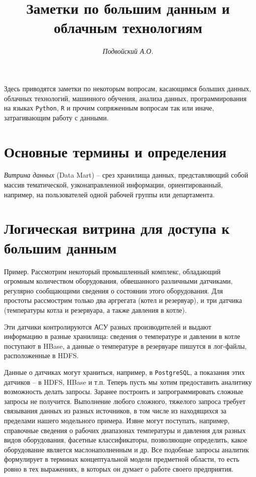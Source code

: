 \documentclass[%
	11pt,
	a4paper,
	utf8,
		]{article}
\begin{document}
\title{Заметки по большим данным и облачным технологиям}

\author{\itshape Подвойский А.О.}

\date{}
\maketitle

\thispagestyle{fancy}

Здесь приводятся заметки по некоторым вопросам, касающимся больших данных, облачных технологий, машинного обучения, анализа данных, программирования на языках \texttt{Python}, \texttt{R} и прочим сопряженным вопросам так или иначе, затрагивающим работу с данными.



\tableofcontents

\section{Основные термины и определения}

\noindent\emph{Витрина данных} (Data Mart) -- срез хранилища данных, представляющий собой массив тематической, узконаправленной информации, ориентированный, например, на пользователей одной рабочей группы или департамента.


\section{Логическая витрина для доступа к большим данным}

Пример. Рассмотрим некоторый промышленный комплекс, обладающий огромным количеством оборудования, обвешанного различными датчиками, регулярно сообщающими сведения о состоянии этого оборудования. Для простоты рассмострим только два аргрегата (котел и резервуар), и три датчика (температуры котла и резервуара, а также давления в котле).

Эти датчики контролируются АСУ разных производителей и выдают информацию в разные хранилища: сведения о температуре и давлении в котле поступают в HBase, а данные о температуре в резервуаре пишутся в лог-файлы, расположенные в HDFS.

Данные о датчиках могут храниться, например, в \texttt{PostgreSQL}, а показания этих датчиков -- в HDFS, HBase и т.п. Теперь пусть мы хотим предоставить аналитику возможность делать запросы. Заранее построить и запрограммировать сложные запросы не получится. Выполнение любого сложного, тяжелого запроса требует связывания данных из разных источников, в том числе из находящихся за пределами нашего модельного примера. Извне могут поступать, например, справочные сведения о рабочих диапазонах температуры и давления для разных видов оборудования, фасетные классификаторы, позволяющие определить, какое оборудование является маслонаполненным и др. Все подобные запросы аналитик формулирует в терминах концептуальной модели предметной области, то есть ровно в тех выражениях, в которых он думает о работе своего предприятия.
\end{document}
